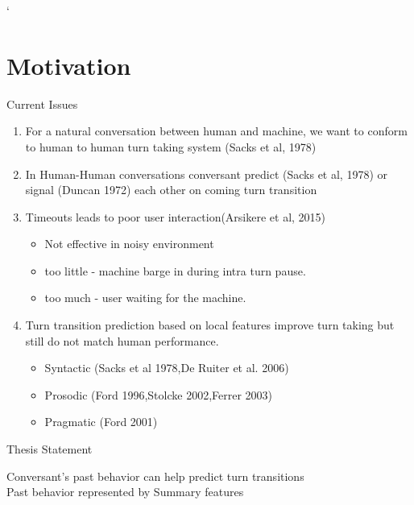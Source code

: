 `%

\section{Motivation}
\frame{\sectionpage}




\begin{frame}{Current Issues}
    \begin{enumerate}[<+->]\itemsep9pt
      \item For a natural conversation between human and machine, we want to conform
            to human to human turn taking system (Sacks et al, 1978)
      \item In Human-Human conversations conversant predict (Sacks et al, 1978) or
            signal (Duncan 1972) each other on coming turn transition
      \item {
        Timeouts leads to poor user interaction(Arsikere et al, 2015)
        \begin{itemize}
            \item Not effective in noisy environment
            \item too little - machine barge in during intra turn pause.
            \item too much - user waiting for the machine.
        \end{itemize}
      }
      \item {
        Turn transition prediction based on local features improve turn taking but still
        do not match human performance.
        \begin{itemize}
            \item Syntactic (Sacks et al 1978,De Ruiter et al. 2006)
            \item Prosodic (Ford 1996,Stolcke 2002,Ferrer 2003)
            \item Pragmatic (Ford 2001)
        \end{itemize}
      }
    \end{enumerate}
\end{frame}

\begin{frame} {Thesis Statement}
 \begin{center}

        \Large{Conversant's past behavior can help predict turn transitions}\\
        \vspace{10mm}
        \Large{Past behavior represented by Summary features}
 \end{center}
 \end{frame} 
 

